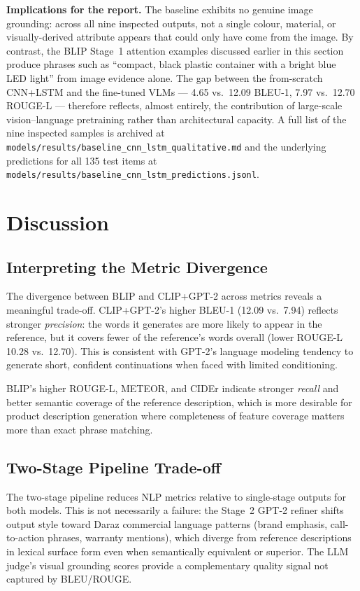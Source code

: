 \documentclass[12pt,a4paper]{article}
\begin{document}
\textbf{Implications for the report.} The baseline exhibits no genuine image
grounding: across all nine inspected outputs, not a single colour, material,
or visually-derived attribute appears that could only have come from the
image. By contrast, the BLIP Stage~1 attention examples discussed earlier
in this section produce phrases such as ``compact, black plastic container
with a bright blue LED light'' from image evidence alone. The gap between the from-scratch CNN+LSTM and the
fine-tuned VLMs --- 4.65 vs.\ 12.09 BLEU-1, 7.97 vs.\ 12.70 ROUGE-L ---
therefore reflects, almost entirely, the contribution of large-scale
vision--language pretraining rather than architectural capacity. A full
list of the nine inspected samples is archived at
\texttt{models/results/baseline\_cnn\_lstm\_qualitative.md} and the
underlying predictions for all 135 test items at
\texttt{models/results/baseline\_cnn\_lstm\_predictions.jsonl}.

\section{Discussion}

\subsection{Interpreting the Metric Divergence}

The divergence between BLIP and CLIP+GPT-2 across metrics reveals a meaningful
trade-off. CLIP+GPT-2's higher BLEU-1 (12.09 vs.\ 7.94) reflects stronger
\emph{precision}: the words it generates are more likely to appear in the reference,
but it covers fewer of the reference's words overall (lower ROUGE-L 10.28 vs.\ 12.70).
This is consistent with GPT-2's language modeling tendency to generate short, confident
continuations when faced with limited conditioning.

BLIP's higher ROUGE-L, METEOR, and CIDEr indicate stronger \emph{recall} and better
semantic coverage of the reference description, which is more desirable for product
description generation where completeness of feature coverage matters more than exact
phrase matching.

\subsection{Two-Stage Pipeline Trade-off}

The two-stage pipeline reduces NLP metrics relative to single-stage outputs for both
models. This is not necessarily a failure: the Stage~2 GPT-2 refiner shifts output
style toward Daraz commercial language patterns (brand emphasis, call-to-action phrases,
warranty mentions), which diverge from reference descriptions in lexical surface form
even when semantically equivalent or superior. The LLM judge's visual grounding scores
provide a complementary quality signal not captured by BLEU/ROUGE.
\end{document}
